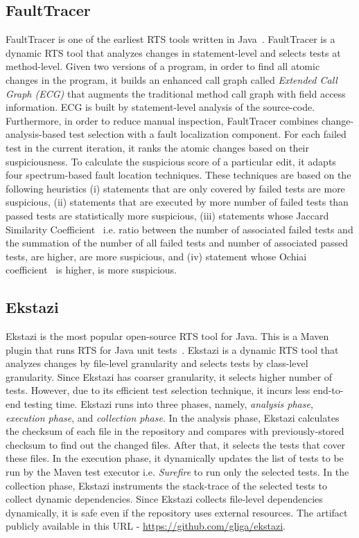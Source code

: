 \subsection{FaultTracer}
FaultTracer is one of the earliest RTS tools written in Java~\cite{faulttracer}. FaultTracer is a dynamic RTS tool that analyzes changes in statement-level and selects tests at method-level. Given two versions of a program, in order to find all atomic changes in the program,  it builds an enhanced call graph called \textit{Extended Call Graph (ECG)} that augments the traditional method call graph with field access information. ECG is built by statement-level analysis of the source-code. Furthermore, in order to reduce manual inspection, FaultTracer combines change-analysis-based test selection with a fault localization component. For each failed test in the current iteration, it ranks the atomic changes based on their suspiciousness. To calculate the suspicious score of a particular edit, it adapts four spectrum-based fault location techniques. These techniques are based on the following heuristics (i) statements that are only covered by failed tests are more suspicious, (ii) statements that are executed by more number of failed tests than passed tests are statistically more suspicious, (iii) statements whose Jaccard Similarity Coefficient~\cite{abreu2007accuracy} i.e. ratio between the number of associated failed tests and the summation of the number of all failed tests and number of associated passed tests, are higher, are more suspicious, and (iv) statement whose Ochiai coefficient~\cite{abreu2007accuracy, yu2008empirical} is higher, is more suspicious. 

\subsection{Ekstazi}
Ekstazi is the most popular open-source RTS tool for Java. This is a Maven plugin that runs RTS for Java unit tests~\cite{ekstazi, gligoric2015ekstazi}. Ekstazi is a dynamic RTS tool that analyzes changes by file-level granularity and selects tests by class-level granularity. Since Ekstazi has coarser granularity, it selects higher number of tests. However, due to its efficient test selection technique, it incurs less end-to-end testing time. Ekstazi runs into three phases, namely, \textit{analysis phase}, \textit{execution phase}, and \textit{collection phase}. In the analysis phase, Ekstazi calculates the checksum of each file in the repository and compares with previously-stored checksum to find out the changed files. After that, it selects the tests that cover these files. In the execution phase, it dynamically updates the list of tests to be run by the Maven test executor i.e. \textit{Surefire} to run only the selected tests. In the collection phase, Ekstazi instruments the stack-trace of the selected tests to collect dynamic dependencies. Since Ekstazi collects file-level dependencies dynamically, it is safe even if the repository uses external resources. The artifact publicly available in this URL - \href{url}{https://github.com/gliga/ekstazi}. 

